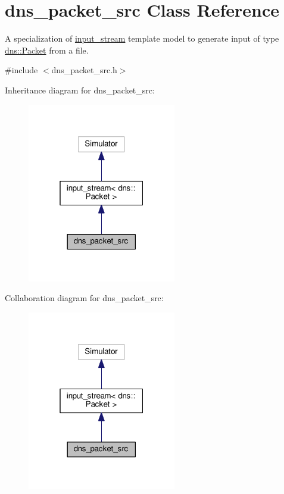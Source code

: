 \hypertarget{classdns__packet__src}{}\section{dns\+\_\+packet\+\_\+src Class Reference}
\label{classdns__packet__src}


A specialization of \hyperlink{classinput__stream}{input\+\_\+stream} template model to generate input of type \hyperlink{structdns_1_1Packet}{dns\+::\+Packet} from a file.  




{\ttfamily \#include $<$dns\+\_\+packet\+\_\+src.\+h$>$}



Inheritance diagram for dns\+\_\+packet\+\_\+src\+:\nopagebreak
\begin{figure}[H]
\begin{center}
\leavevmode
\includegraphics[width=184pt]{classdns__packet__src__inherit__graph}
\end{center}
\end{figure}


Collaboration diagram for dns\+\_\+packet\+\_\+src\+:\nopagebreak
\begin{figure}[H]
\begin{center}
\leavevmode
\includegraphics[width=184pt]{classdns__packet__src__coll__graph}
\end{center}
\end{figure}
